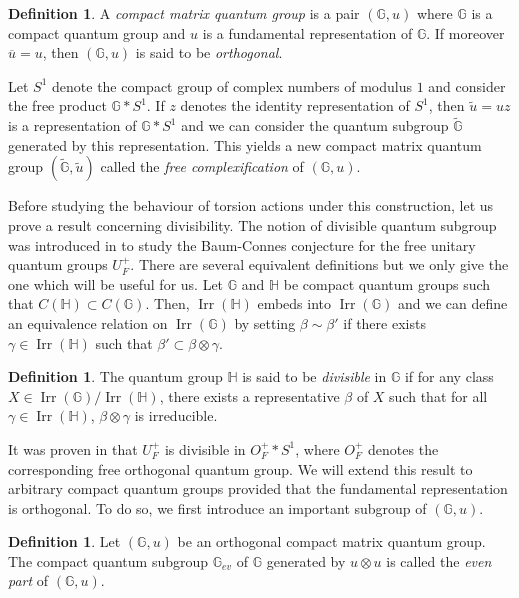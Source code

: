 \documentclass[a4paper, 11pt]{amsart}
\theoremstyle{plain}
\theoremstyle{definition}
\newtheorem{de}[thm]{Definition}
\theoremstyle{remark}
\DeclareMathOperator{\Irr}{Irr}
\newcommand{\G}{\mathbb{G}}
\newcommand{\HH}{\mathbb{H}}
\begin{document}
\begin{de}
A \emph{compact matrix quantum group} is a pair $(\G, u)$ where $\G$ is a compact quantum group and $u$ is a fundamental representation of $\G$. If moreover $\overline{u} = u$, then $(\G, u)$ is said to be \emph{orthogonal}.
\end{de}

Let $S^{1}$ denote the compact group of complex numbers of modulus $1$ and consider the free product $\G\ast S^{1}$. If $z$ denotes the identity representation of $S^{1}$, then $\widetilde{u} = uz$ is a representation of $\G\ast S^{1}$ and we can consider the quantum subgroup $\widetilde{\G}$ generated by this representation. This yields a new compact matrix quantum group $(\widetilde{\G}, \widetilde{u})$ called the \emph{free complexification} of $(\G, u)$.

Before studying the behaviour of torsion actions under this construction, let us prove a result concerning divisibility. The notion of divisible quantum subgroup was introduced in \cite{vergnioux2013k} to study the Baum-Connes conjecture for the free unitary quantum groups $U_{F}^{+}$. There are several equivalent definitions but we only give the one which will be useful for us. Let $\G$ and $\HH$ be compact quantum groups such that $C(\HH)\subset C(\G)$. Then, $\Irr(\HH)$ embeds into $\Irr(\G)$ and we can define an equivalence relation on $\Irr(\G)$ by setting $\beta\sim\beta'$ if there exists $\gamma\in \Irr(\HH)$ such that $\beta'\subset \beta\otimes \gamma$.

\begin{de}
The quantum group $\HH$ is said to be \emph{divisible} in $\G$ if for any class $X\in \Irr(\G)/\Irr(\HH)$, there exists a representative $\beta$ of $X$ such that for all $\gamma\in \Irr(\HH)$, $\beta\otimes \gamma$ is irreducible.
\end{de}

It was proven in \cite[Prop 4.3]{vergnioux2013k} that $U_{F}^{+}$ is divisible in $O_{F}^{+}\ast S^{1}$, where $O_{F}^{+}$ denotes the corresponding free orthogonal quantum group. We will extend this result to arbitrary compact quantum groups provided that the fundamental representation is orthogonal. To do so, we first introduce an important subgroup of $(\G, u)$.

\begin{de}
Let $(\G, u)$ be an orthogonal compact matrix quantum group. The compact quantum subgroup $\G_{ev}$ of $\G$ generated by $u\otimes u$ is called the \emph{even part} of $(\G, u)$.
\end{de}
\end{document}
